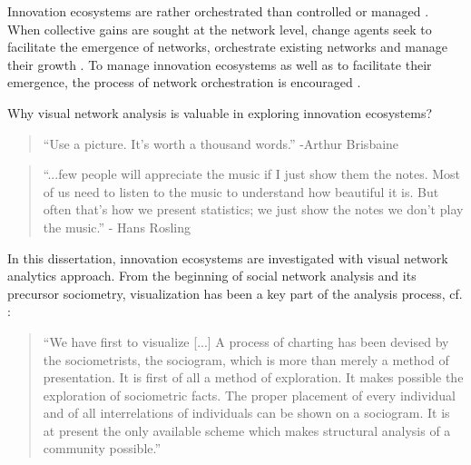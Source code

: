 Innovation ecosystems are rather orchestrated than controlled or managed \citep{Russell2011TransformingOrchestration,Ritala2009,Ritala2013}. When collective gains are sought at the network level, change agents seek to facilitate the emergence of networks, orchestrate existing networks and manage their growth \citep{Russell2011TransformingOrchestration}. To manage innovation ecosystems as well as to facilitate their emergence, the process of network orchestration is encouraged \citep{Russell2015RelationalEcosystems}.

Why visual network analysis is valuable in exploring innovation ecosystems?

\begin{quote}
``Use a picture. It's worth a thousand words.'' -Arthur Brisbaine \citep{Bendoly2016FitAnalytics}
\end{quote}

\begin{quote}
``...few people will appreciate the music if I just show them the notes. Most of us need to listen to the music to understand how beautiful it is. But often that’s how we present statistics; we just show the notes we don’t play the music.'' - Hans Rosling 
\end{quote}

In this dissertation, innovation ecosystems are investigated with visual network analytics approach. From the beginning of social network analysis and its precursor sociometry, visualization has been a key part of the analysis process, cf. \cite{Moreno1953}:
\begin{quote}
``We have first to visualize [...] A process of charting has been devised by the sociometrists, the sociogram, which is more than merely a method of presentation. It is first of all a method of exploration. It makes possible the exploration of sociometric facts. The proper placement of every individual and of all interrelations of individuals can be shown on a sociogram. It is at present the only available scheme which makes structural analysis of a community possible.''\end{quote}

